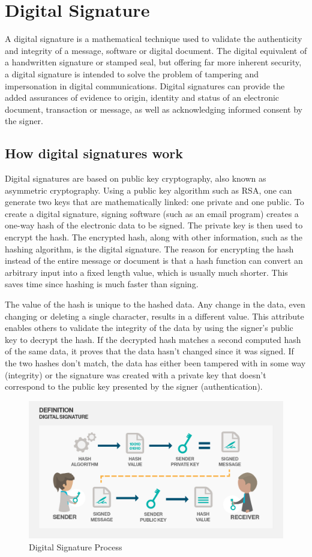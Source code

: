 \section{Digital Signature}
\label{sec:S3_digsign}

A digital signature is a mathematical technique used to validate the authenticity and integrity of a message, software or digital document.
The digital equivalent of a handwritten signature or stamped seal, but offering far more inherent security, a digital signature is intended to solve the problem of tampering and impersonation in digital communications. Digital signatures can provide the added assurances of evidence to origin, identity and status of an electronic document, transaction or message, as well as acknowledging informed consent by the signer.

\subsection{How digital signatures work}
\label{subsec:dgsign_work}

Digital signatures are based on public key cryptography, also known as asymmetric cryptography. Using a public key algorithm such as RSA, one can generate two keys that are mathematically linked: one private and one public. To create a digital signature, signing software (such as an email program) creates a one-way hash of the electronic data to be signed. The private key is then used to encrypt the hash. The encrypted hash, along with other information, such as the hashing algorithm, is the digital signature. The reason for encrypting the hash instead of the entire message or document is that a hash function can convert an arbitrary input into a fixed length value, which is usually much shorter. This saves time since hashing is much faster than signing.

The value of the hash is unique to the hashed data. Any change in the data, even changing or deleting a single character, results in a different value. This attribute enables others to validate the integrity of the data by using the signer's public key to decrypt the hash. If the decrypted hash matches a second computed hash of the same data, it proves that the data hasn't changed since it was signed. If the two hashes don't match, the data has either been tampered with in some way (integrity) or the signature was created with a private key that doesn't correspond to the public key presented by the signer (authentication). \cite{digsign}


\begin {figure}[h]
\graphicspath{{images/chapter_s3/}}
\includegraphics[width=\textwidth]{digsign}
\caption{Digital Signature Process}
\end {figure}

